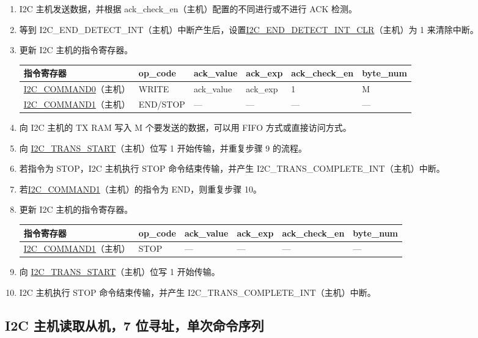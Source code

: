 \documentclass[main\_\_CN.tex]{subfiles}
\begin{document}
\begin{enumerate}
\begin{itemize}
\end{itemize}
\item I2C 主机发送数据，并根据 ack\_check\_en（主机）配置的不同进行或不进行 ACK 检测。
\item 等到 I2C\_END\_DETECT\_INT（主机）中断产生后，设置\hyperref[fielddesc:I2CENDDETECTINTCLR]{I2C\_END\_DETECT\_INT\_CLR}（主机）为 1 来清除中断。
\item 更新 I2C 主机的指令寄存器。
\begin{longtable}{ | p{4cm} | p{2cm} | p{2cm} | p{2cm} |p{2cm} | p{2cm} |}
\hline\rowcolor{lightgray}
指令寄存器& op\_code & ack\_value&ack\_exp&ack\_check\_en&byte\_num  \\ \hline
\hyperref[fielddesc:I2CCOMMAND0]{I2C\_COMMAND0}（主机）& WRITE& ack\_value&ack\_exp&1&M  \\ \hline
\hyperref[fielddesc:I2CCOMMAND1]{I2C\_COMMAND1}（主机）& END/STOP& ---&---&---&---  \\ \hline
\end{longtable}
\item 向 I2C 主机的 TX RAM 写入 M 个要发送的数据，可以用 FIFO 方式或直接访问方式。
\item 向 \hyperref[fielddesc:I2CTRANSSTART]{I2C\_TRANS\_START}（主机）位写 1 开始传输，并重复步骤 9 的流程。
\item 若指令为 STOP，I2C 主机执行 STOP 命令结束传输，并产生 I2C\_TRANS\_COMPLETE\_INT（主机）中断。
\item 若\hyperref[fielddesc:I2CCOMMAND1]{I2C\_COMMAND1}（主机）的指令为 END，则重复步骤 10。
\item 更新 I2C 主机的指令寄存器。
\begin{longtable}{ | p{4cm} | p{2cm} | p{2cm} | p{2cm} |p{2cm} | p{2cm} |}
\hline\rowcolor{lightgray}
指令寄存器& op\_code & ack\_value&ack\_exp&ack\_check\_en&byte\_num  \\ \hline
\hyperref[fielddesc:I2CCOMMAND1]{I2C\_COMMAND1}（主机）& STOP& ---&---&---&---  \\ \hline
\end{longtable}
\item 向 \hyperref[fielddesc:I2CTRANSSTART]{I2C\_TRANS\_START}（主机）位写 1 开始传输。
\item I2C 主机执行 STOP 命令结束传输，并产生 I2C\_TRANS\_COMPLETE\_INT（主机）中断。
\end{enumerate}

\subsection{I2C 主机读取从机，7 位寻址，单次命令序列}
\end{document}
